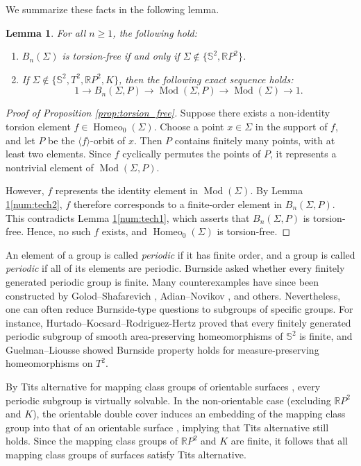 \documentclass[12pt,a4paper]{amsart}
\numberwithin{equation}{section}
\DeclareMathOperator{\Mod}{Mod}
\DeclareMathOperator{\Homeo}{Homeo}
\newcommand{\SSS}{\mathbb{S}}
\theoremstyle{plain}
\newtheorem{lemma}[theorem]{Lemma}
\theoremstyle{definition}
\theoremstyle{remark}
\begin{document}
We summarize these facts in the following lemma.

\begin{lemma} \label{lem:tech}
For all $n \geq 1$, the following hold:
\begin{enumerate}
\item \label{num:tech1} $B_n(\Sigma)$ is torsion-free if and only if $\Sigma \notin \{ \mathbb{S}^2, \mathbb{R}P^2 \}$.
\item \label{num:tech2} If $\Sigma \notin \{\mathbb{S}^2, T^2, \mathbb{R}P^2, K\}$, then the following exact sequence holds:
\[
1 \to B_n(\Sigma, P) \to \Mod(\Sigma, P) \to \Mod(\Sigma) \to 1.
\]
\end{enumerate}
\end{lemma}

\begin{proof}[Proof of Proposition \ref{prop:torsion_free}]
Suppose there exists a non-identity torsion element $f \in \Homeo_0(\Sigma)$.
Choose a point $x \in \Sigma$ in the support of $f$, and let $P$ be the $\langle f \rangle$-orbit of $x$.
Then $P$ contains finitely many points, with at least two elements.
Since $f$ cyclically permutes the points of $P$, it represents a nontrivial element of $\Mod(\Sigma, P)$.

However, $f$ represents the identity element in $\Mod(\Sigma)$.
By Lemma \ref{lem:tech}\eqref{num:tech2}, $f$ therefore corresponds to a finite-order element in $B_n(\Sigma, P)$.
This contradicts Lemma \ref{lem:tech}\eqref{num:tech1}, which asserts that $B_n(\Sigma, P)$ is torsion-free.
Hence, no such $f$ exists, and $\Homeo_0(\Sigma)$ is torsion-free.
\end{proof}

An element of a group is called \emph{periodic} if it has finite order, and a group is called \emph{periodic} if all of its elements are periodic.
Burnside asked whether every finitely generated periodic group is finite.
Many counterexamples have since been constructed by Golod--Shafarevich \cite{MR161852}, Adian--Novikov \cite{MR240178, MR240179, MR240180}, and others.
Nevertheless, one can often reduce Burnside-type questions to subgroups of specific groups.
For instance, Hurtado--Kocsard--Rodriguez-Hertz \cite{MR4173155} proved that every finitely generated periodic subgroup of smooth area-preserving homeomorphisms of $\SSS^2$ is finite, and Guelman--Liousse \cite{MR3158049} showed Burnside property holds for measure-preserving homeomorphisms on $T^2$.

By Tits alternative for mapping class groups of orientable surfaces \cite{MR800253}, every periodic subgroup is virtually solvable.
In the non-orientable case (excluding $\mathbb{R}P^2$ and $K$), the orientable double cover induces an embedding of the mapping class group into that of an orientable surface \cite{MR300288, MR2675928, MR4729813}, implying that Tits alternative still holds.
Since the mapping class groups of $\mathbb{R}P^2$ and $K$ are finite, it follows that all mapping class groups of surfaces satisfy Tits alternative.
\end{document}
